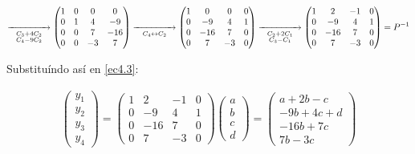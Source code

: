 \documentclass[twoside]{report}
\theoremstyle{mystyle}
\begin{document}
$$
\underset{\substack{C_{3} + 4C_{2} \\ C_{4} - 9C_{2}}}{\xrightarrow{\hspace{15mm}}}
\begin{pmatrix}
1 & 0 & 0 & 0\\
0 & 1 & 4 & -9\\
0 & 0 & 7 & -16\\
0 & 0 & -3 & 7
\end{pmatrix}
\underset{C_{4} \leftrightarrow C_{2}}{\xrightarrow{\hspace{15mm}}}
\begin{pmatrix}
1 & 0 & 0 & 0\\
0 & -9 & 4 & 1\\
0 & -16 & 7 & 0\\
0 & 7 & -3 & 0
\end{pmatrix}
\underset{\substack{C_{2} + 2C_{1} \\ C_{3} - C_{1}}}{\xrightarrow{\hspace{15mm}}}
\begin{pmatrix}
1 & 2 & -1 & 0\\
0 & -9 & 4 & 1\\
0 & -16 & 7 & 0\\
0 & 7 & -3 & 0
\end{pmatrix}
= P^{-1}
$$

\vspace{3mm}

\noindent Substituíndo así en \eqref{ec4.3}:

\begin{align*}
    \begin{pmatrix}
    y_{1}\\ y_{2} \\ y_{3} \\ y_{4}
    \end{pmatrix}
    =
    \begin{pmatrix}
    1 & 2 & -1 & 0\\
    0 & -9 & 4 & 1\\
    0 & -16 & 7 & 0\\
    0 & 7 & -3 & 0
    \end{pmatrix}
    \begin{pmatrix}
    a \\ b \\ c \\ d
    \end{pmatrix}
    =
    \begin{pmatrix}
    a + 2b -c \\ -9b + 4c + d \\ -16b + 7c \\ 7b -3c
    \end{pmatrix}
\end{align*}
\end{document}
